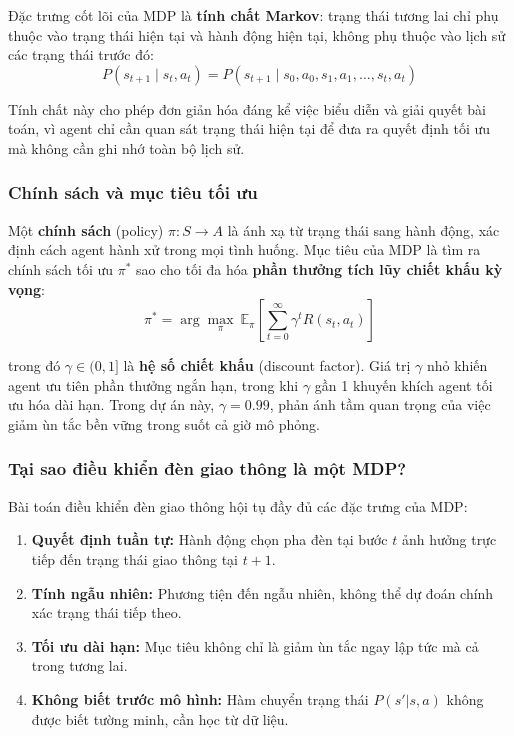 Đặc trưng cốt lõi của MDP là \textbf{tính chất Markov}: trạng thái tương lai chỉ phụ thuộc vào trạng thái hiện tại và hành động hiện tại, không phụ thuộc vào lịch sử các trạng thái trước đó:
\[
P(s_{t+1} \mid s_t, a_t) = P(s_{t+1} \mid s_0, a_0, s_1, a_1, \ldots, s_t, a_t)
\]

Tính chất này cho phép đơn giản hóa đáng kể việc biểu diễn và giải quyết bài toán, vì agent chỉ cần quan sát trạng thái hiện tại để đưa ra quyết định tối ưu mà không cần ghi nhớ toàn bộ lịch sử.

\subsubsection{Chính sách và mục tiêu tối ưu}

Một \textbf{chính sách} (policy) $\pi: S \to A$ là ánh xạ từ trạng thái sang hành động, xác định cách agent hành xử trong mọi tình huống. Mục tiêu của MDP là tìm ra chính sách tối ưu $\pi^*$ sao cho tối đa hóa \textbf{phần thưởng tích lũy chiết khấu kỳ vọng}:
\[
\pi^* = \arg\max_\pi\ \mathbb{E}_\pi\left[\sum_{t=0}^{\infty} \gamma^t R(s_t, a_t)\right]
\]

trong đó $\gamma \in (0, 1]$ là \textbf{hệ số chiết khấu} (discount factor). Giá trị $\gamma$ nhỏ khiến agent ưu tiên phần thưởng ngắn hạn, trong khi $\gamma$ gần 1 khuyến khích agent tối ưu hóa dài hạn. Trong dự án này, $\gamma = 0.99$, phản ánh tầm quan trọng của việc giảm ùn tắc bền vững trong suốt cả giờ mô phỏng.

\subsubsection{Tại sao điều khiển đèn giao thông là một MDP?}

Bài toán điều khiển đèn giao thông hội tụ đầy đủ các đặc trưng của MDP:
\begin{enumerate}
    \item \textbf{Quyết định tuần tự:} Hành động chọn pha đèn tại bước $t$ ảnh hưởng trực tiếp đến trạng thái giao thông tại $t+1$.
    \item \textbf{Tính ngẫu nhiên:} Phương tiện đến ngẫu nhiên, không thể dự đoán chính xác trạng thái tiếp theo.
    \item \textbf{Tối ưu dài hạn:} Mục tiêu không chỉ là giảm ùn tắc ngay lập tức mà cả trong tương lai.
    \item \textbf{Không biết trước mô hình:} Hàm chuyển trạng thái $P(s'|s,a)$ không được biết tường minh, cần học từ dữ liệu.
\end{enumerate}


